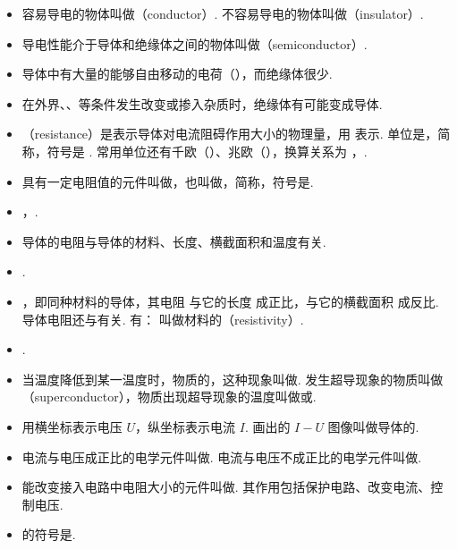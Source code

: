 \begin{itemize}
\item 容易导电的物体叫做（conductor）. 不容易导电的物体叫做（insulator）.
\item 导电性能介于导体和绝缘体之间的物体叫做（semiconductor）.
\item 导体中有大量的能够自由移动的电荷（），而绝缘体很少.
\item 在外界、、等条件发生改变或掺入杂质时，绝缘体有可能变成导体.
\item {}（resistance）是表示导体对电流阻碍作用大小的物理量，用  表示. 单位是，简称，符号是 \blue{$\bm\Omega$}. 常用单位还有千欧（）、兆欧（），换算关系为 ，.
\item 具有一定电阻值的元件叫做，也叫做，简称，符号是\resistance. 
\item {}，.
\item 导体的电阻与导体的材料、长度、横截面积和温度有关.
\item {}.
\item {}，即同种材料的导体，其电阻  与它的长度  成正比，与它的横截面积  成反比. 导体电阻还与有关. 有：
\newline \blue{$\bm\rho$} 叫做材料的（resistivity）.
\item {}.
\item 当温度降低到某一温度时，物质的，这种现象叫做. 发生超导现象的物质叫做（superconductor），物质出现超导现象的温度叫做或.
\item 用横坐标表示电压 $U$，纵坐标表示电流 $I$. 画出的 $I-U$ 图像叫做导体的.
\item 电流与电压成正比的电学元件叫做. 电流与电压不成正比的电学元件叫做.
\item 能改变接入电路中电阻大小的元件叫做. 其作用包括保护电路、改变电流、控制电压.
\item {}的符号是\slidingrheostat.
\end{itemize}